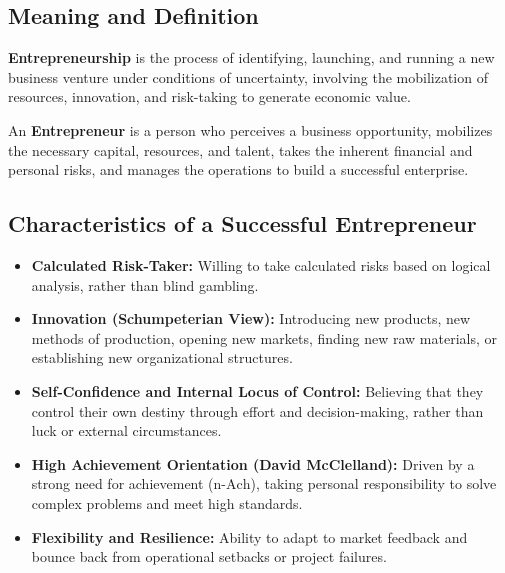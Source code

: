 \documentclass[12pt,a4paper]{article}
\begin{document}
\subsection{Meaning and Definition}
\begin{tcolorbox}[defbox, title={Definition of Entrepreneurship}]
\textbf{Entrepreneurship} is the process of identifying, launching, and running a new business venture under conditions of uncertainty, involving the mobilization of resources, innovation, and risk-taking to generate economic value.
\par\vspace{3pt}
An \textbf{Entrepreneur} is a person who perceives a business opportunity, mobilizes the necessary capital, resources, and talent, takes the inherent financial and personal risks, and manages the operations to build a successful enterprise.
\end{tcolorbox}

\subsection{Characteristics of a Successful Entrepreneur}
\begin{itemize}[leftmargin=*, itemsep=3pt]
  \item \textbf{Calculated Risk-Taker:} Willing to take calculated risks based on logical analysis, rather than blind gambling.
  \item \textbf{Innovation (Schumpeterian View):} Introducing new products, new methods of production, opening new markets, finding new raw materials, or establishing new organizational structures.
  \item \textbf{Self-Confidence and Internal Locus of Control:} Believing that they control their own destiny through effort and decision-making, rather than luck or external circumstances.
  \item \textbf{High Achievement Orientation (David McClelland):} Driven by a strong need for achievement ($\text{n-Ach}$), taking personal responsibility to solve complex problems and meet high standards.
  \item \textbf{Flexibility and Resilience:} Ability to adapt to market feedback and bounce back from operational setbacks or project failures.
\end{itemize}
\end{document}
